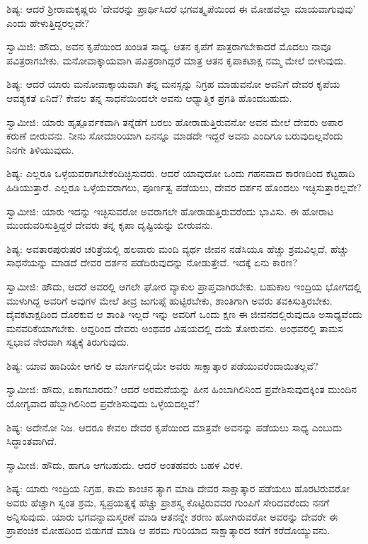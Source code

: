 ಶಿಷ್ಯ: ಆದರೆ ಶ‍್ರೀರಾಮಕೃಷ್ಣರು 'ದೇವರನ್ನು ಪ್ರಾರ್ಥಿಸಿದರೆ ಭಗವತ್ಕೃಪೆಯಿಂದ ಈ ಮೋಹವೆಲ್ಲಾ ಮಾಯವಾಗುವುವು' ಎಂದು ಹೇಳುತ್ತಿದ್ದರಲ್ಲವೇ?

ಸ್ವಾಮಿಜಿ: ಹೌದು, ಅವನ ಕೃಪೆಯಿಂದ ಖಂಡಿತ ಸಾಧ್ಯ. ಆತನ ಕೃಪೆಗೆ ಪಾತ್ರರಾಗಬೇಕಾದರೆ ಮೊದಲು ನಾವೂ ಪವಿತ್ರರಾಗಬೇಕು. ಮನೋವಾಕ್ಕಾಯವಾಗಿ ಪವಿತ್ರರಾಗಿದ್ದರೆ ಮಾತ್ರ ಆತನ ಕೃಪಾಕಟಾಕ್ಷ ನಮ್ಮ ಮೇಲೆ ಬೀಳುವುದು.

ಶಿಷ್ಯ: ಆದರೆ ಯಾರು ಮನೋವಾಕ್ಕಾಯವಾಗಿ ತನ್ನ ಮನಸ್ಸನ್ನು ನಿಗ್ರಹ ಮಾಡುವನೋ ಅವನಿಗೆ ದೇವರ ಕೃಪೆಯ ಆವಶ್ಯಕತೆ ಏನಿದೆ? ಕೇವಲ ತನ್ನ ಸಾಧನೆಯಿಂದಲೇ ಅವನು ಆಧ್ಯಾತ್ಮಿಕ ಪ್ರಗತಿ ಹೊಂದಬಹುದು.

ಸ್ವಾಮೀಜಿ: ಯಾರು ಹೃತ್ಪೂರ್ವಕವಾಗಿ ತನ್ನೆಡೆಗೆ ಬರಲು ಹೋರಾಡುತ್ತಿರುವನೋ ಅವನ ಮೇಲೆ ದೇವರು ಅಪಾರ ಕರುಣೆ ಬೀರುವನು. ನೀನು ಸೋಮಾರಿಯಾಗಿ ಏನನ್ನೂ ಮಾಡದೇ ಇದ್ದರೆ ಅವನು ಎಂದಿಗೂ ಬರುವುದಿಲ್ಲವೆಂದು ನಿನಗೇ ತಿಳಿಯುವುದು.

ಶಿಷ್ಯ: ಎಲ್ಲರೂ ಒಳ್ಳೆಯವರಾಗಬೇಕೆಂದಿಚ್ಛಿಸುವರು. ಆದರೆ ಯಾವುದೋ ಒಂದು ಗಹನವಾದ ಕಾರಣದಿಂದ ಕೆಟ್ಟಹಾದಿ ಹಿಡಿಯುತ್ತಾರೆ. ಎಲ್ಲರೂ ಒಳ್ಳೆಯವರಾಗಲು, ಪೂರ್ಣತ್ವ ಪಡೆಯಲು, ದೇವರ ದರ್ಶನ ಹೊಂದಲು ಇಚ್ಛಿಸುತ್ತಾರಲ್ಲವೇ?

ಸ್ವಾಮೀಜಿ: ಯಾರು ಇದನ್ನು ಇಚ್ಛಿಸುವರೋ ಅವರಾಗಲೇ ಹೋರಾಡುತ್ತಿರುವರೆಂದು ಭಾವಿಸು. ಈ ಹೋರಾಟ ಮುಂದುವರಿಸುತ್ತಿದ್ದರೆ ದೇವರು ತನ್ನ ಕೃಪಾ ದೃಷ್ಟಿಯನ್ನು ಬೀರುವನು.

ಶಿಷ್ಯ: ಅವತಾರಪುರುಷರ ಚರಿತ್ರೆಯಲ್ಲಿ ಹಲವಾರು ಮಂದಿ ವ್ಯರ್ಥ ಜೀವನ ನಡೆಸಿಯೂ ಹೆಚ್ಚು ಶ್ರಮವಿಲ್ಲದೆ, ಹೆಚ್ಚು ಸಾಧನೆಯನ್ನು ಮಾಡದೆ ದೇವರ ದರ್ಶನ ಪಡೆದಿರುವುದನ್ನು ನೋಡುತ್ತೇವೆ. ಇದಕ್ಕೆ ಏನು ಕಾರಣ?

ಸ್ವಾಮೀಜಿ: ಹೌದು, ಆದರೆ ಅವರಲ್ಲಿ ಆಗಲೇ ಘೋರ ವ್ಯಾಕುಲ ಪ್ರಾಪ್ತವಾಗಿರಬೇಕು. ಬಹುಕಾಲ ಇಂದ್ರಿಯ ಭೋಗದಲ್ಲಿ ಮುಳುಗಿದ್ದ ಅವರಿಗೆ ಅವುಗಳ ಮೇಲೆ ತೀವ್ರ ಜುಗುಪ್ಸೆ ಹುಟ್ಟಿರಬೇಕು, ಶಾಂತಿಗಾಗಿ ಅವರು ತವಕಿಸುತ್ತಿರಬೇಕು. ದೈವಕಟಾಕ್ಷದಿಂದ ದೊರಕುವ ಆ ಶಾಂತಿ ಇಲ್ಲದೆ ಇನ್ನು ಅವರಿಗೆ ಒಂದು ಕ್ಷಣ ಈ ಜೀವನದಲ್ಲಿರುವುದೂ ಅಸಾಧ್ಯವೆಂದು ಮನವರಿಕೆಯಾಗಬೇಕು. ಆದ್ದರಿಂದ ದೇವರು ಅಂಥವರ ವಿಷಯದಲ್ಲಿ ದಯೆ ತೋರುವನು. ಅಂಥವರಲ್ಲಿ ತಾಮಸ ಸ್ವಭಾವ ನೇರವಾಗಿ ಸತ್ಯಕ್ಕೆ ತಿರುಗುವುದು.

ಶಿಷ್ಯ: ಯಾವ ಹಾದಿಯೇ ಆಗಲಿ ಆ ಮಾರ್ಗದಲ್ಲಿಯೇ ಅವರು ಸಾಕ್ಷಾತ್ಕಾರ ಪಡೆಯುವರೆಂದಾಯಿತಲ್ಲವೆ?

ಸ್ವಾಮೀಜಿ: ಹೌದು, ಏಕಾಗಬಾರದು? ಆದರೆ ಅರಮನೆಯನ್ನು ಹೀನ ಹಿಂಬಾಗಿಲಿನಿಂದ ಪ್ರವೇಶಿಸುವುದಕ್ಕಿಂತ ಮುಂದಿನ ಯೋಗ್ಯವಾದ ಹೆಬ್ಬಾಗಿಲಿನಿಂದ ಪ್ರವೇಶಿಸುವುದು ಒಳ್ಳೆಯದಲ್ಲವೆ?

ಶಿಷ್ಯ: ಅದೇನೋ ನಿಜ. ಆದರೂ ಕೇವಲ ದೇವರ ಕೃಪೆಯಿಂದ ಮಾತ್ರವೇ ಅವನನ್ನು ಪಡೆಯಲು ಸಾಧ್ಯ ಎಂಬುದು ಸಿದ್ಧಾಂತವಾಗಿದೆ.

ಸ್ವಾಮೀಜಿ: ಹೌದು, ಹಾಗೂ ಆಗಬಹುದು. ಆದರೆ ಅಂತಹವರು ಬಹಳ ವಿರಳ.

ಶಿಷ್ಯ: ಯಾರು ಇಂದ್ರಿಯ ನಿಗ್ರಹ, ಕಾಮ ಕಾಂಚನ ತ್ಯಾಗ ಮಾಡಿ ದೇವರ ಸಾಕ್ಷಾತ್ಕಾರ ಪಡೆಯಲು ಹೊರಟಿರುವರೋ ಅವರು ಹೆಚ್ಚಾಗಿ ಸ್ವಂತ ಶ್ರಮ, ಸ್ವಪ್ರಯತ್ನಕ್ಕೆ ಹೆಚ್ಚು ಪ್ರಾಶಸ್ತ್ಯ ಕೊಟ್ಟಿರುವವರ ಗುಂಪಿಗೆ ಸೇರಿದವರೆಂದು ನನಗೆ ಅನ್ನಿಸುವುದು. ಯಾರು ಭಗವನ್ನಾಮಸ್ಮರಣೆ ಮಾಡಿ ಆತನನ್ನೇ ಶರಣು ಹೋಗಿರುವರೋ ಅವರನ್ನು ದೇವರೇ ಈ ಪ್ರಾಪಂಚಿಕ ಮೋಹದಿಂದ ಬಿಡುಗಡೆ ಮಾಡಿ ಆ ಪರಮ ಗುರಿಯಾದ ಸಾಕ್ಷಾತ್ಕಾರದ ಕಡೆಗೆ ಕರೆದೊಯ್ಯುವನು.

